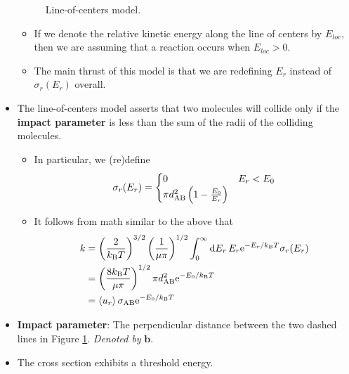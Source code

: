 \documentclass[../notes.tex]{subfiles}
\begin{document}
\begin{itemize}
\begin{figure}[h!]
        \caption{Line-of-centers model.}
        \label{fig:lineOfCenters}
    \end{figure}
    \begin{itemize}
        \item If we denote the relative kinetic energy along the line of centers by $E_{loc}$, then we are assuming that a reaction occurs when $E_{loc}>0$.
        \item The main thrust of this model is that we are redefining $E_r$ instead of $\sigma_r(E_r)$ overall.
    \end{itemize}
    \item The line-of-centers model asserts that two molecules will collide only if the \textbf{impact parameter} is less than the sum of the radii of the colliding molecules.
    \begin{itemize}
        \item In particular, we (re)define
        \begin{equation*}
            \sigma_r(E_r) =
            \begin{cases}
                0 & E_r<E_0\\
                \pi d_{\ce{A}\ce{B}}^2\left( 1-\frac{E_0}{E_r} \right)
            \end{cases}
        \end{equation*}
        \item It follows from math similar to the above that
        \begin{align*}
            k &= \left( \frac{2}{\kB T} \right)^{3/2}\left( \frac{1}{\mu\pi} \right)^{1/2}\int_0^\infty\dd{E_r}E_r\e[-E_r/\kB T]\sigma_r(E_r)\\
            &= \left( \frac{8\kB T}{\mu\pi} \right)^{1/2}\pi d_{\ce{A}\ce{B}}^2\e[-E_0/\kB T]\\
            &= \prb{u_r}\sigma_{\ce{A}\ce{B}}\e[-E_0/\kB T]
        \end{align*}
    \end{itemize}
    \item \textbf{Impact parameter}: The perpendicular distance between the two dashed lines in Figure \ref{fig:lineOfCenters}. \emph{Denoted by} $\bm{b}$.
    \item The cross section exhibits a threshold energy.

\end{itemize}
\end{document}
